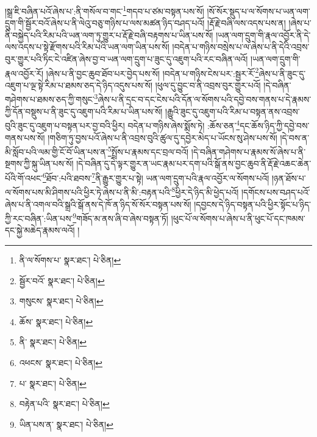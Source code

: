 །སྒྲ་ཇི་བཞིན་པའོ་ཞེས་པ་:ནི་གསོལ་བ་གང་\footnote{ནི་ལ་སོགས་པ་  སྣར་ཐང་།  པེ་ཅིན། }གདབ་པ་ཙམ་བསྟན་པས་སོ། །སོ་སོར་སྡུད་པ་ལ་སོགས་པ་ཡན་ལག་དྲུག་གི་སྦྱོར་བའོ་ཞེས་པ་ནི་ལེའུ་བཅུ་གཉིས་པ་ལས་མཚན་ཉིད་བཤད་པའོ། །རྡོ་རྗེ་བཞི་ལས་འདས་པས་ན། །ཞེས་པ་ནི་བསྐྱེད་པའི་རིམ་པའི་ཡན་ལག་ཏུ་གྱུར་པ་རྡོ་རྗེ་བཞི་བརྟགས་པ་ཡིན་པས་སོ། །ཡན་ལག་དྲུག་གི་རྣལ་འབྱོར་ནི་དེ་ལས་འདས་པ་སྟེ་རྫོགས་པའི་རིམ་པའི་ཡན་ལག་ཡིན་པས་སོ། །བདེན་པ་གཉིས་བསྲེས་པ་ལ་ཞེས་པ་ནི་དེའི་འབྲས་བུར་གྱུར་པའི་ཏིང་ངེ་འཛིན་ཞེས་བྱ་བ་ཡན་ལག་དྲུག་པ་ཟུང་དུ་འཇུག་པའི་རང་བཞིན་ལའོ། །ཡན་ལག་དྲུག་གི་རྣལ་འབྱོར་རོ། །ཞེས་པ་ནི་བྱང་ཆུབ་ཐོབ་པར་བྱེད་པས་སོ། །བདེན་པ་གཉིས་ངེས་པར་:སྦྱར་རོ་\footnote{སྦྱོར་བའོ་  སྣར་ཐང་།  པེ་ཅིན། }ཞེས་པ་ནི་ཟུང་དུ་འཇུག་པ་ལྔ་སྟེ་རིམ་པ་ཐམས་ཅད་དེ་ཉིད་འདུས་པས་སོ། །ཕུལ་དུ་བྱུང་བ་ནི་འབྲས་བུར་གྱུར་པའོ། །དེ་བཞིན་གཤེགས་པ་ཐམས་ཅད་ཀྱི་གསུང་\footnote{གསུངས་  སྣར་ཐང་།  པེ་ཅིན། }ཞེས་པ་ནི་དྲང་བ་དང་ངེས་པའི་དོན་ལ་སོགས་པའི་དབྱེ་བས་གནས་པ་དེ་རྣམས་ཀྱི་དོན་བསྡུས་པ་ནི་ཟུང་དུ་འཇུག་པའི་རིམ་པ་ཡིན་པས་སོ། །རྒྱུའི་ཟུང་དུ་འཇུག་པའི་རིམ་པ་བསྟན་ནས་འབྲས་བུའི་ཟུང་དུ་འཇུག་པ་བསྟན་པར་བྱ་བའི་ཕྱིར། བདེན་པ་གཉིས་ཞེས་སྨོས་ཏེ། :ཆོས་ཅན་\footnote{ཆོས་  སྣར་ཐང་།  པེ་ཅིན། }དང་ཆོས་ཉིད་ཀྱི་དབྱེ་བས་གནས་པས་སོ། །གཅིག་ཏུ་བྱས་པའོ་ཞེས་པ་ནི་འབྲས་བུའི་ཚུལ་དུ་དབྱེར་མེད་པ་ཡོངས་སུ་ཤེས་པས་སོ། །དེ་བས་ན་མི་སློབ་པའི་ལམ་གྱི་ངོ་བོ་ཡིན་པས་ན་\footnote{ནི་  སྣར་ཐང་།  པེ་ཅིན། }སྤྲོས་པ་རྣམས་དང་བྲལ་བའོ། །དེ་བཞིན་གཤེགས་པ་རྣམས་སོ་ཞེས་པ་ནི་སྔགས་ཀྱི་སྐུ་ཡིན་པས་སོ། །དེ་བཞིན་དུ་དེ་ལྟར་གྱུར་ན་ཡང་རྣམ་པར་དག་པའི་སྒོ་ནས་བྱང་ཆུབ་ནི་རྡོ་རྗེ་འཆང་ཆེན་པོའི་གོ་འཕང་\footnote{འཕངས་  སྣར་ཐང་།  པེ་ཅིན། }ཐོབ་:པའི་ཐབས་\footnote{པ་  སྣར་ཐང་།  པེ་ཅིན། }ནི་རྒྱུར་གྱུར་པ་སྟེ། ཡན་ལག་དྲུག་པའི་རྣལ་འབྱོར་ལ་སོགས་པའོ། །ཉན་ཐོས་པ་ལ་སོགས་པས་མི་ཤིགས་པའི་ཕྱིར་ཏེ་ཞེས་པ་ནི་མི་:བརྟན་པའི་\footnote{བརྟེན་པའི་  སྣར་ཐང་།  པེ་ཅིན། }ཕྱིར་དེ་ཉིད་མི་ཕྱེད་པའོ། །དགོངས་པས་བཤད་པའོ་ཞེས་པ་ནི་འགལ་བའི་སྒྲའི་སྒོ་ནས་དེ་ཁོ་ན་ཉིད་སོ་སོར་བསྟན་པས་སོ། །དབྱངས་དེ་ཉིད་བསྟན་པའི་ཕྱིར་སྟོང་པ་ཉིད་ཀྱི་རང་བཞིན་:ཡིན་པས་\footnote{ཡིན་པས་ན་  སྣར་ཐང་།  པེ་ཅིན། }གཟོད་མ་ནས་ཞི་བ་ཞེས་བསྟན་ཏོ། །ཕུང་པོ་ལ་སོགས་པ་ཞེས་པ་ནི་ཕུང་པོ་དང་ཁམས་དང་སྐྱེ་མཆེད་རྣམས་ལའོ། །
